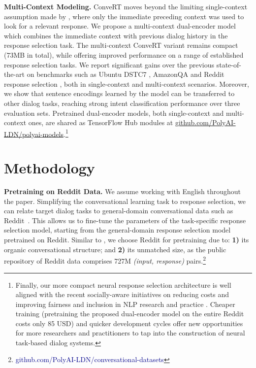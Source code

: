 \documentclass[11pt,a4paper]{article}
\begin{document}
\vspace{1.4mm}
\noindent \textbf{Multi-Context Modeling.} 
ConveRT moves beyond the limiting single-context assumption made by , where only the immediate preceding context was used to look for a relevant response. We propose a multi-context dual-encoder model which combines the immediate context with previous dialog history in the response selection task. The multi-context ConveRT variant remains compact (73MB in total), while offering improved performance on a range of established response selection tasks. We report significant gains over the previous state-of-the-art on benchmarks such as Ubuntu DSTC7 \cite{Gunasekara:2019dstc7}, AmazonQA \cite{Wan:2016icdm} and Reddit response selection \cite{Henderson:2019arxiv}, both in single-context and multi-context scenarios. Moreover, we show that sentence encodings learned by the model can be transferred to other dialog tasks, reaching strong intent classification performance over three evaluation sets. Pretrained dual-encoder models, both single-context and multi-context ones, are shared as TensorFlow Hub modules at \href{https://github.com/PolyAI-LDN/polyai-models}{\ttfamily \small github.com/PolyAI-LDN/polyai-models}.\footnote{Finally, our more compact neural response selection architecture is well aligned with the recent socially-aware initiatives on reducing costs and improving fairness and inclusion in NLP research and practice \cite{Strubell:2019acl,Mirzadeh:2019arxiv,Schwartz:2019green}. Cheaper training (pretraining the proposed dual-encoder model on the entire Reddit costs only 85 USD) and quicker development cycles offer new opportunities for more researchers and practitioners to tap into the construction of neural task-based dialog systems. }



%
 
\section{Methodology}
\label{s:methodology}
\noindent \textbf{Pretraining on Reddit Data.} 
We assume working with English throughout the paper. Simplifying the conversational learning task to response selection, we can relate target dialog tasks to general-domain conversational data such as Reddit~\cite{AlRfou:2016arxiv}. This allows us to fine-tune the parameters of the task-specific response selection model, starting from the general-domain response selection model pretrained on Reddit. Similar to , we choose Reddit  for pretraining due to: \textbf{1)} its organic conversational structure; and \textbf{2)} its unmatched size, as the public repository of Reddit data comprises 727M \textit{(input, response)} pairs.\footnote{\textcolor{darkblue}{github.com/PolyAI-LDN/conversational-datasets}}
\end{document}
